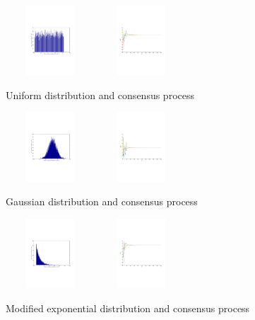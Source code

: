 \documentclass[10pt,journal,compsoc]{IEEEtran}
\begin{document}
\begin{figure}[!htb]
 \centering
 \includegraphics[width=3.3cm, height=2.6cm]{NMDis}
 \includegraphics[width=3.3cm, height=2.6cm]{Normconsensus}
 \caption{Uniform distribution and consensus process}\label{uniformDis}
\end{figure}

\begin{figure}[!htb]
 \centering
 \includegraphics[width=3.3cm, height=2.6cm]{GSDis}
 \includegraphics[width=3.3cm, height=2.6cm]{GSconsensus}
 \caption{Gaussian distribution and consensus process}\label{Gaussian}
\end{figure}

\begin{figure}[!htb]
 \centering
 \includegraphics[width=3.3cm, height=2.6cm]{EXDis}
 \includegraphics[width=3.3cm, height=2.6cm]{EXconsensus}
 \caption{Modified exponential distribution and consensus process}\label{ex}
\end{figure}
\end{document}
